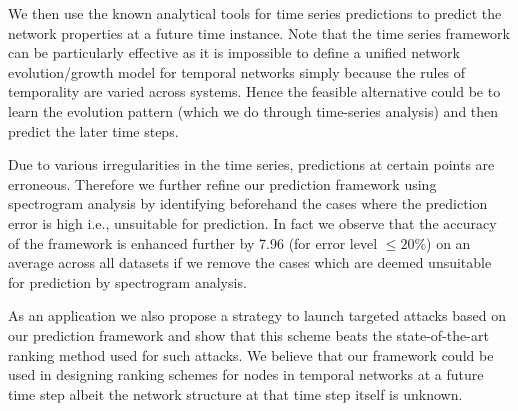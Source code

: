 We then use the known analytical tools for time series predictions to predict the network properties at a future time instance. 
Note that the time series framework can be particularly effective as it is impossible to 
define a unified network evolution/growth model for temporal networks simply because the  
rules of temporality are varied across systems. Hence the feasible alternative could be to learn 
the evolution pattern (which we do through time-series analysis) and then predict the later time steps. 

Due to various irregularities in the time series, predictions at certain points are erroneous. Therefore we 
further refine our prediction framework using spectrogram analysis by identifying beforehand the cases where the 
prediction error is high i.e., unsuitable for prediction. In fact we observe that the accuracy of the framework is 
enhanced further by 7.96 (for error level $\leq 20\%$) on an average across all datasets 
if we remove 
the cases which are deemed unsuitable for prediction by spectrogram analysis.

As an application we also propose a strategy to launch targeted attacks based on our prediction framework and show that this scheme beats the state-of-the-art ranking method 
used for such attacks. We believe that our framework could be used in designing ranking schemes for nodes in temporal networks at a future time step  
albeit the network structure at that time step itself is unknown.


